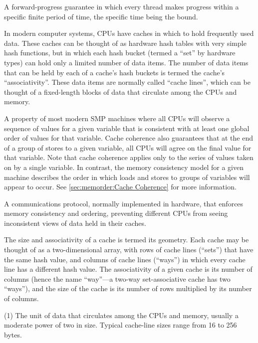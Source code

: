 \begin{description}
	A forward-progress guarantee in which every thread makes
	progress within a specific finite period of time, the specific
	time being the bound.
\item[\IX{Cache}:]
	In modern computer systems, CPUs have caches in which to hold
	frequently used data.
	These caches can be thought of as hardware hash tables with very
	simple hash functions,
	but in which each hash bucket (termed a ``set'' by hardware types)
	can hold only a limited number of data items.
	The number of data items that can be held by each of a cache's hash
	buckets is termed the cache's ``associativity''.
	These data items are normally called ``cache lines'', which
	can be thought of a fixed-length blocks of data that circulate
	among the CPUs and memory.
\item[\IX{Cache Coherence}:]
	A property of most modern SMP machines where all CPUs will
	observe a sequence of values for a given variable that is
	consistent with at least one global order of values for
	that variable.
	Cache coherence also guarantees that at the end of a group
	of stores to a given variable, all CPUs will agree
	on the final value for that variable.
	Note that cache coherence applies only to the series of values
	taken on by a single variable.
	In contrast, the memory consistency model for a given machine
	describes the order in which loads and stores to groups of
	variables will appear to occur.
	See \cref{sec:memorder:Cache Coherence}
	for more information.
\item[\IX{Cache-Coherence Protocol}:]
	A communications protocol, normally implemented in hardware,
	that enforces memory consistency and ordering, preventing
	different CPUs from seeing inconsistent views of data held
	in their caches.
\item[\IX{Cache Geometry}:]
	The size and associativity of a cache is termed its geometry.
	Each cache may be thought of as a two-dimensional array,
	with rows of cache lines (``sets'') that have the same hash
	value, and columns of cache lines (``ways'') in which every
	cache line has a different hash value.
	The associativity of a given cache is its number of
	columns (hence the name ``way''---a two-way set-associative
	cache has two ``ways''), and the size of the cache is its
	number of rows multiplied by its number of columns.
\item[\IX{Cache Line}:]
	(1) The unit of data that circulates among the CPUs and memory,
	usually a moderate power of two in size.
	Typical cache-line sizes range from 16 to 256 bytes. \\

\end{description}
